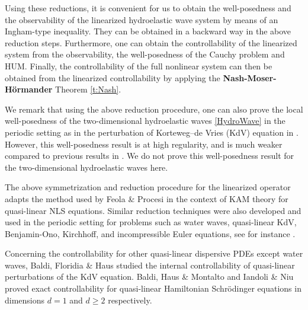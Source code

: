 \documentclass[12pt]{amsart}
\theoremstyle{remark}
\theoremstyle{definition}
\numberwithin{equation}{section}
\begin{document}
Using these reductions, it is convenient for us to obtain the well-posedness and the observability of the linearized hydroelastic wave system by means of an Ingham-type inequality.
They can be obtained in a backward way in the above reduction steps.
Furthermore, one can obtain the controllability of the linearized system from the observability, the well-posedness of the Cauchy problem and HUM.
Finally, the controllability of the full nonlinear system can then be obtained from the linearized controllability by applying the \textbf{Nash-Moser-H\"ormander} Theorem \ref{t:Nash}.

We remark that using the above reduction procedure, one can also prove the local well-posedness of the two-dimensional hydroelastic waves \eqref{HydroWave} in the periodic setting as in the perturbation of Korteweg–de Vries (KdV) equation in \cite{BFH}.
However, this well-posedness result is at high regularity, and is much weaker compared to previous results in \cite{MR4104949, WanY}.
We do not prove this well-posedness result for the two-dimensional hydroelastic waves here.

The above symmetrization and reduction procedure for the linearized operator adapts the method used by Feola \& Procesi \cite{MR3360677} in the context of KAM theory for quasi-linear NLS equations. 
Similar reduction techniques were also  developed and used in the periodic setting for problems such as water waves, quasi-linear KdV, Benjamin-Ono, Kirchhoff, and incompressible Euler equations, see for instance \cite{MR2187619,MR3011291, MR3201904, MR3569244, MR3502158, MR3356988, MR3776276, MR4062430, MR3603787, MR4242904, MR4246389, MR4228858, MR4658635}.

Concerning the controllability for other quasi-linear dispersive PDEs except water waves, Baldi, Floridia \& Haus \cite{BFH,MR3711883} 
studied the internal controllability of quasi-linear perturbations of the KdV equation. 
Baldi, Haus \& Montalto \cite{BHM} and Iandoli \& Niu \cite{MR4700171} proved exact controllability for quasi-linear Hamiltonian Schrödinger equations in dimensions $d=1$ and $d\geq 2$ respectively.
\end{document}
